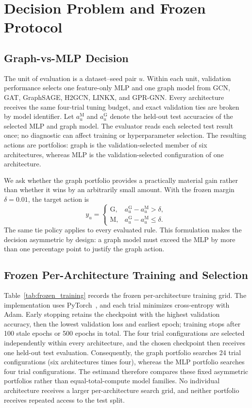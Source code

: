 \section{Decision Problem and Frozen Protocol}
\label{sec:protocol}

\subsection{Graph-vs-MLP Decision}

The unit of evaluation is a dataset--seed pair $u$. Within each unit, validation performance selects one feature-only MLP and one graph model from GCN, GAT, GraphSAGE, H2GCN, LINKX, and GPR-GNN. Every architecture receives the same four-trial tuning budget, and exact validation ties are broken by model identifier. Let $a_u^{\mathrm{M}}$ and $a_u^{\mathrm{G}}$ denote the held-out test accuracies of the selected MLP and graph model. The evaluator reads each selected test result once; no diagnostic can affect training or hyperparameter selection. The resulting actions are portfolios: graph is the validation-selected member of six architectures, whereas MLP is the validation-selected configuration of one architecture.

We ask whether the graph portfolio provides a practically material gain rather than whether it wins by an arbitrarily small amount. With the frozen margin $\delta=0.01$, the target action is
\begin{equation}
y_u =
\begin{cases}
\mathrm{G}, & a_u^{\mathrm{G}}-a_u^{\mathrm{M}}>\delta,\\
\mathrm{M}, & a_u^{\mathrm{G}}-a_u^{\mathrm{M}}\leq\delta.
\end{cases}
\label{eq:decision_target}
\end{equation}
The same tie policy applies to every evaluated rule. This formulation makes the decision asymmetric by design: a graph model must exceed the MLP by more than one percentage point to justify the graph action.

\subsection{Frozen Per-Architecture Training and Selection}

Table~\ref{tab:frozen_training} records the frozen per-architecture training grid. The implementation uses PyTorch~\cite{paszke2019pytorch}, and each trial minimizes cross-entropy with Adam. Early stopping retains the checkpoint with the highest validation accuracy, then the lowest validation loss and earliest epoch; training stops after 100 stale epochs or 500 epochs in total. The four trial configurations are selected independently within every architecture, and the chosen checkpoint then receives one held-out test evaluation. Consequently, the graph portfolio searches 24 trial configurations (six architectures times four), whereas the MLP portfolio searches four trial configurations. The estimand therefore compares these fixed asymmetric portfolios rather than equal-total-compute model families. No individual architecture receives a larger per-architecture search grid, and neither portfolio receives repeated access to the test split.


